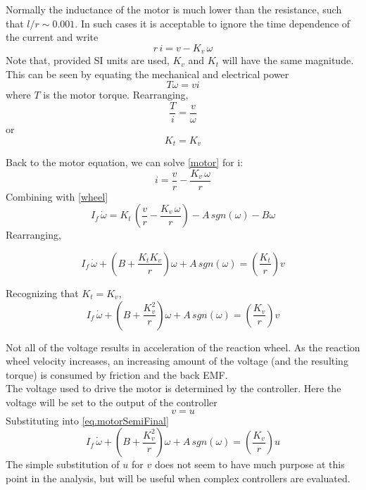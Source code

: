 \documentclass[12pt,letterpaper]{article}
\begin{document}
Normally the inductance of the motor is much lower than the resistance, such that $l/r \sim 0.001$.  
In such cases it is acceptable to ignore the time dependence of the current and write
%
\begin{equation}
    r \,i = v - K_{v} \, \omega \label{motor}
\end{equation}
%
Note that, provided SI units are used, $K_{v}$ and $K_{t}$ will have the same magnitude.  This can be seen by equating the 
mechanical and electrical power
%
\begin{equation}
    T \omega = v i
\end{equation}
%
where $T$ is the motor torque.
Rearranging,
%
\begin{equation}
    \frac{T}{i} = \frac{v}{\omega}
\end{equation}
%
or
%
\begin{equation}
    K_{t} = K_{v} 
\end{equation}
%

Back to the motor equation, we can solve \eqref{motor} for i:
%
\begin{equation}
    i = \frac{v}{r} - \frac{K_{v} \, \omega}{r}
\end{equation}
%
Combining with \eqref{wheel}
%
\begin{equation}
    I_{f} \, \dot{\omega}  =  K_{t} \, \left( \frac{v}{r} - \frac{ K_{v} \, \omega}{r} \right) - A \, sgn(\omega ) - B \omega
\end{equation}
Rearranging,

\begin{equation}
    I_{f} \, \dot{\omega} + \left( B+\frac{K_{t} K_{v}}{r} \right) \omega +A \, sgn(\omega)= \left(\frac{K_{t}} {r}\right)v 
\end{equation}

Recognizing that $K_{t} = K_{v}$,
\begin{equation}
    I_{f} \, \dot{\omega} + \left( B+\frac{K_{v}^2}{r} \right) \omega +A \, sgn(\omega)= \left(\frac{K_{v}} {r}\right)v\label{eq.motorSemiFinal} 
\end{equation}

Not all of the voltage results in acceleration of the reaction wheel.  As the reaction wheel velocity increases, an
increasing amount of the voltage (and the resulting torque) is consumed by friction and the back EMF.\\

The voltage used to drive the motor is determined by the controller.  Here the voltage will be set to the output of the controller
\begin{equation}
    v = u 
\end{equation}
Substituting into \eqref{eq.motorSemiFinal}
\begin{equation}
    I_{f} \, \dot{\omega} + \left( B+\frac{K_{v}^2}{r} \right) \omega +A \, sgn(\omega)= \left(\frac{K_{v}} {r}\right)u\label{eq.motorFinal} 
\end{equation}
The simple substitution of $u$ for $v$ does not seem to have much purpose at this point in the analysis, but will be useful
when complex controllers are evaluated.\\
\end{document}
